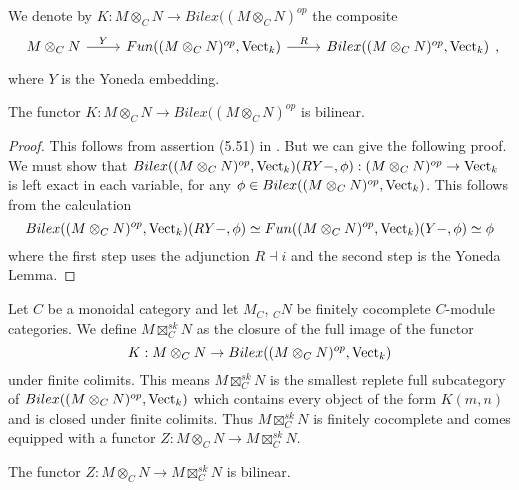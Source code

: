 \begin{definition}\label{def_K}

  \noindent We denote by $K:M\otimes_C N\to Bilex((M\otimes_C N)^{op}$ the composite
  \[
  \begin{tikzcd}
    {M\otimes_C N} & {Fun((M\otimes_C N)^{op},\Vect_k)} & {Bilex((M\otimes_C N)^{op},\Vect_k)}
    \arrow["Y", from=1-1, to=1-2]
    \arrow["R", from=1-2, to=1-3]
  \end{tikzcd},
  \]
  where $Y$ is the Yoneda embedding.\end{definition}
\begin{lemma}\label{right_exact_0}

The functor $K:M\otimes_C N\to Bilex((M\otimes_C N)^{op}$ is bilinear.\end{lemma}

\begin{proof}

  This follows from assertion (5.51) in \cite{kelly/basic-concepts-enriched}.
  But we can give the following proof. We must show that $Bilex((M\otimes_C
  N)^{op},\operatorname{Vect}_k)(RY-,\phi):(M\otimes_C N)^{op}\to\operatorname{Vect}_k$ is left exact in
  each variable, for any $\phi\in Bilex((M\otimes_C N)^{op},\operatorname{Vect}_k)$. This
  follows from the calculation $$Bilex((M\otimes_C
  N)^{op},\operatorname{Vect}_k)(RY-,\phi)\simeq Fun((M\otimes_C
  N)^{op},\operatorname{Vect}_k)(Y-,\phi)\simeq \phi$$ where the first step uses the
  adjunction $R\dashv i$ and the second step is the Yoneda Lemma.
\end{proof}

\begin{definition}\label{sk_nonsemisimple}

  \noindent Let $C$ be a monoidal category and let $M_C$, $_{C}N$ be finitely
  cocomplete $C$-module categories. We define $M\boxtimes_C^{sk}N$ as the
  closure of the full image of the functor $$K:M\otimes_C N \to
  Bilex((M\otimes_C N)^{op},\operatorname{Vect}_k)$$ under finite colimits. This means
  $M\boxtimes_C^{sk}N$ is the smallest replete full subcategory of
  $Bilex((M\otimes_C N)^{op},\operatorname{Vect}_k)$ which contains every object of the form
  $K(m,n)$ and is closed under finite colimits. Thus $M\boxtimes_C^{sk}N$ is
  finitely cocomplete and comes equipped with a functor $Z:M\otimes_C N \to
  M\boxtimes_C^{sk}N$.
\end{definition}

\begin{lemma}\label{right_exact}
  The functor $Z:M\otimes_C N \to M\boxtimes_C^{sk}N$ is bilinear.
\end{lemma}


